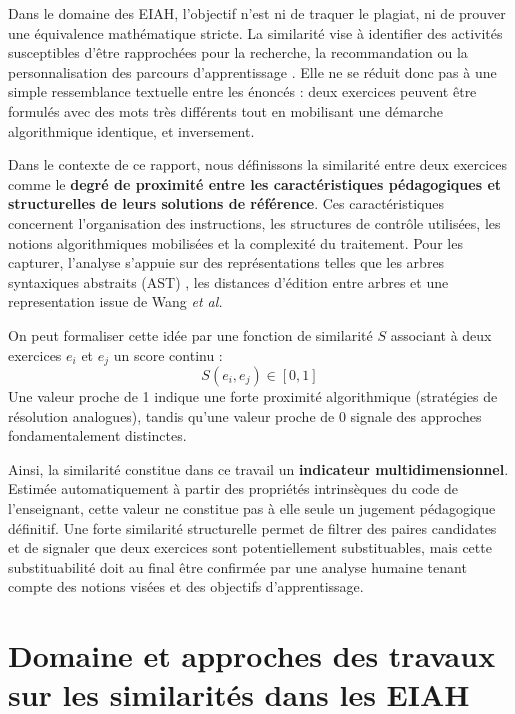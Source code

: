\documentclass[12pt,a4paper,oneside]{report}
\begin{document}
Dans le domaine des EIAH, l'objectif n'est ni de traquer le plagiat, ni de prouver une équivalence mathématique stricte. La similarité vise à identifier des activités susceptibles d'être rapprochées pour la recherche, la recommandation ou la personnalisation des parcours d'apprentissage \cite{liu_2018,tian_2022}. Elle ne se réduit donc pas à une simple ressemblance textuelle entre les énoncés : deux exercices peuvent être formulés avec des mots très différents tout en mobilisant une démarche algorithmique identique, et inversement.

Dans le contexte de ce rapport, nous définissons la similarité entre deux
 exercices comme le \textbf{degré de proximité entre les caractéristiques 
 pédagogiques et structurelles de leurs solutions de référence}. Ces
  caractéristiques concernent l'organisation des instructions, les 
  structures de contrôle utilisées, les notions algorithmiques mobilisées 
  et la complexité du traitement. Pour les capturer, l'analyse s'appuie sur
   des représentations telles que les arbres syntaxiques abstraits (AST) \cite{baxter_clone_1998},
    les distances d'édition entre arbres \cite{zhang_simple_1989} et une representation issue  de Wang \emph{et al.} \cite{wang_detection_2014}


On peut formaliser cette idée par une fonction de similarité $S$ associant à deux exercices $e_i$ et $e_j$ un score continu :
$$S(e_i, e_j) \in [0, 1]$$
Une valeur proche de 1 indique une forte proximité algorithmique (stratégies de résolution analogues), tandis qu'une valeur proche de 0 signale des approches fondamentalement distinctes. 

Ainsi, la similarité constitue dans ce travail un \textbf{indicateur multidimensionnel}.
 Estimée automatiquement à partir des propriétés intrinsèques du code de l'enseignant, cette valeur
  ne constitue pas à elle seule un jugement pédagogique définitif. Une forte similarité structurelle
   permet de filtrer des paires candidates et de signaler que deux exercices sont potentiellement 
   substituables, mais cette substituabilité doit au final être confirmée par une
    analyse humaine tenant compte des notions visées et des objectifs d'apprentissage.



\section{Domaine et approches des travaux sur les similarités dans les EIAH}
\end{document}
